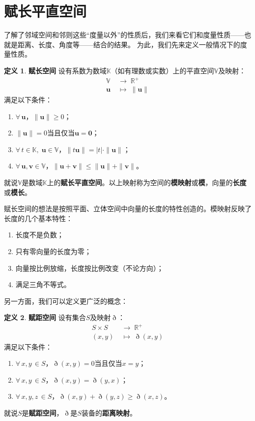 \documentclass[12pt,UTF8]{ctexbook}
\theoremstyle{definition}
\newtheorem{df}{定义}[section]
\theoremstyle{plain}
\begin{document}
\section{赋长平直空间}

了解了邻域空间和邻则这些“度量以外”的性质后，我们来看它们和度量性质——也就是距离、长度、角度等——结合的结果。
为此，我们先来定义一般情况下的度量性质。

\begin{df}{\textbf{赋长空间}}
    设有系数为数域$\mathbb{K}$（如有理数或实数）上的平直空间$\mathbb{V}$及映射：
    \begin{align*}
        \mathbb{V} \;&\rightarrow \;\mathbb{R}^+ \\
        \mathbf{u} \;&\mapsto \;\| \mathbf{u} \|
    \end{align*}
    满足以下条件：
    \begin{enumerate}
        \item $\forall \, \mathbf{u}$，$\|\mathbf{u}\| \geqslant 0$；
        \item $\| \mathbf{u} \| = 0$当且仅当$\mathbf{u} = \mathbf{0}$；
        \item $\forall \, t \in \mathbb{K}, \; \mathbf{u}\in \mathbb{V}$，$\| t\mathbf{u}\| = |t|\cdot \|\mathbf{u}\|$；
        \item $\forall \, \mathbf{u}, \mathbf{v} \in \mathbb{V}$，$\|\mathbf{u} + \mathbf{v}\| \leqslant \|\mathbf{u}\| + \|\mathbf{v}\|$。
    \end{enumerate}
    就说$\mathbb{V}$是数域$\mathbb{K}$上的\textbf{赋长平直空间}。以上映射称为空间的\textbf{模映射}或\textbf{模}，向量的\textbf{长度}或\textbf{模长}。
\end{df}

赋长空间的想法是按照平面、立体空间中向量的长度的特性创造的。模映射反映了长度的几个基本特性：
\begin{enumerate}
    \item 长度不是负数；
    \item 只有零向量的长度为零；
    \item 向量按比例放缩，长度按比例改变（不论方向）；
    \item 满足三角不等式。
\end{enumerate}

另一方面，我们可以定义更广泛的概念：
\begin{df}{\textbf{赋距空间}}
    设有集合$S$及映射$\eth$：
    \begin{align*}
        S\times S \;&\rightarrow \; \mathbb{R}^+ \\
        (x, y) \;&\mapsto \; \eth(x, y)
    \end{align*}
    满足以下条件：
    \begin{enumerate}
        \item $\forall \, x, y\, \in S$，$\eth(x, y) = 0$当且仅当$x = y$；
        \item $\forall \, x, y\, \in S$，$\eth(x, y) = \eth(y, x)$；
        \item $\forall \, x, y, z\, \in S$，$\eth(x, y) + \eth(y, z) \geqslant \eth (x, z)$。
    \end{enumerate}
    就说$S$是\textbf{赋距空间}，$\eth$是$S$装备的\textbf{距离映射}。
\end{df}
\end{document}
